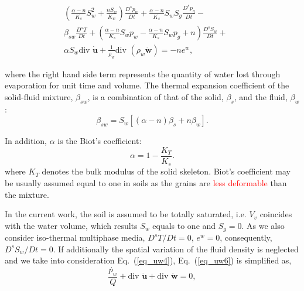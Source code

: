 \documentclass[twocolumn]{svjour3}          %
\begin{document}
\begin{eqnarray}\label{eq_uw6}
\left( \frac{\alpha-n}{K_s}S_w^2+\frac{nS_w}{K_w}\right)\frac{D^s p_w}{D t} + \frac{\alpha-n}{K_s}S_wS_g\frac{D^s p_g}{D t} -&&  \nonumber \\ 
 \beta_{sw}\frac{D^s T}{D t} +  \left(\frac{\alpha-n}{K_s}S_w p_w-\frac{\alpha-n}{K_s}S_w p_g+n\right)\frac{D^s S_w}{D t}  +&&  \nonumber \\ 
\alpha S_w  \mbox{div } \dot{\boldsymbol{u}}  + \frac{1}{\rho_w} \mbox{div } (\rho_w \dot{\boldsymbol{w}}) = - n e^w, &&  %
\end{eqnarray}

where the right hand side term represents the quantity of water lost through evaporation for unit time and volume. The  thermal expansion coefficient of the solid-fluid mixture, $\beta_{sw}$, is a combination of that of the solid, $\beta_s$, and  the fluid, $\beta_w$:
\begin{equation}
\beta_{sw} = S_w [(\alpha-n)\beta_s +n \beta_w].
\end{equation}

In addition, $\alpha$ is the Biot's coefficient:
\begin{equation}\label{eq_uw7}
\alpha=1-\frac{K_T}{K_s}.
\end{equation}
where $K_T$ denotes the %
 bulk modulus of the solid skeleton.  Biot's coefficient may be usually assumed equal to one in soils as the grains are \textcolor{red}{less deformable} than the mixture. 
   
In the current work, the soil is assumed to be totally saturated, i.e. $V_v$ coincides with the water volume, which results  $S_w$ equals to one and $S_g=0$. As we also consider iso-thermal multiphase media,  $D^s T/D t =0$, $e^w=0$, consequently, %
$D^s S_w/D t =0$. If  additionally the spatial variation of the fluid density is neglected and we take into consideration Eq.~(\ref{eq_uw4}),  Eq.~(\ref{eq_uw6}) is simplified as,
\begin{equation}
\frac{\dot{p_w}}{Q} +  \mbox{div }  \boldsymbol{\dot{u}} + \mbox{div } \boldsymbol{\dot{w}} = 0 \label{eq_uw10},
\end{equation}

\end{document}
